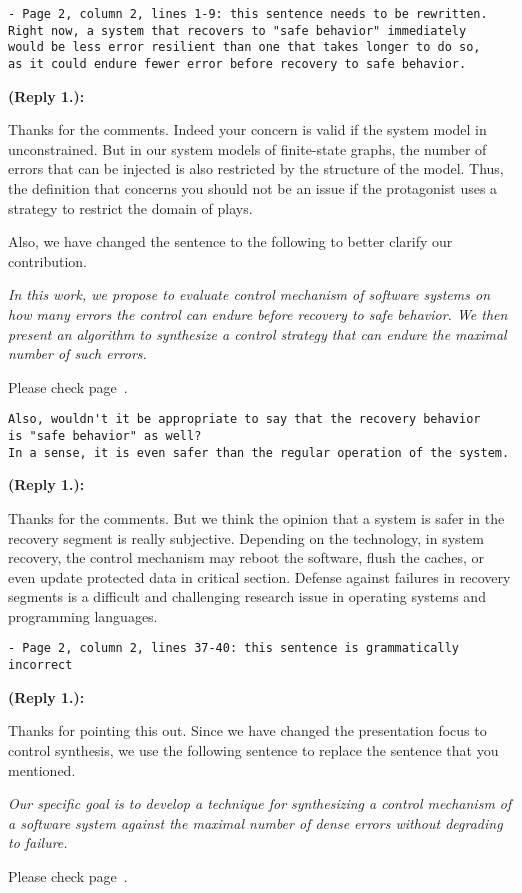 \documentclass[times,10pt,twocolumn]{article}
\newcounter{cabbage0}
\newcounter{cabbage1}
\newcounter{cabbage2}
\newcounter{cabbage3}
\newcounter{bean0}
\newcounter{bean1}
\newcounter{bean2}
\newcounter{bean3}
\newcounter{bean4}
\newcounter{bean5}
\newcounter{bean6}
\newenvironment{reply1}{\begin{list}{\bf (Reply 1.\arabic{bean1}):} 
        {\usecounter{bean1}\setcounter{bean1}{\value{cabbage1}} \item \setcounter{cabbage1}{\value{bean1}} 
        }
}{\end{list}}
\begin{document}
\begin{verbatim}
- Page 2, column 2, lines 1-9: this sentence needs to be rewritten. 
Right now, a system that recovers to "safe behavior" immediately 
would be less error resilient than one that takes longer to do so, 
as it could endure fewer error before recovery to safe behavior. 
\end{verbatim}
\begin{reply1} 
Thanks for the comments. 
Indeed your concern is valid if the system model in unconstrained. 
But in our system models of finite-state graphs, the number of errors that 
can be injected is also restricted by the structure of the model.  
Thus, the definition that concerns you should not be an issue if the 
protagonist uses a strategy to restrict the domain of plays.  

Also, we have changed the sentence to the following to better clarify our 
contribution. 
\begin{center} 
\parbox{140mm}{\em 
In this work, we propose to evaluate control mechanism 
of software systems on 
how many errors the control can endure before recovery to safe behavior. 
We then present an algorithm to synthesize a control strategy
that can endure the maximal number of such errors.  
}
\end{center} 
Please check page~\pageref{reply1.less.errors.more.resilient}.  
\end{reply1} 
\begin{verbatim}
Also, wouldn't it be appropriate to say that the recovery behavior 
is "safe behavior" as well? 
In a sense, it is even safer than the regular operation of the system.
\end{verbatim}
\begin{reply1} 
Thanks for the comments. 
But we think the opinion that a system is safer in the recovery segment is really subjective. 
Depending on the technology, 
in system recovery, the control mechanism may reboot the software, 
flush the caches, or even update protected data in critical section.  
Defense against failures in recovery segments is a difficult and challenging 
research issue in operating systems and programming languages. 
\end{reply1} 
\begin{verbatim}
- Page 2, column 2, lines 37-40: this sentence is grammatically incorrect
\end{verbatim}
\begin{reply1} 
Thanks for pointing this out. 
Since we have changed the presentation focus to control synthesis, we 
use the following sentence to replace the sentence that you mentioned. 
\begin{center} 
\parbox{140mm}{\em 
Our specific goal is to develop a technique for synthesizing a 
control mechanism of a software system against the maximal number of dense errors 
without degrading to failure.
}
\end{center} 
Please check page~\pageref{reply1.grammar.inco.specific.goal}. 
\end{reply1} 
\end{document}
